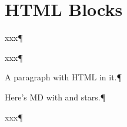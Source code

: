 

\section{HTML Blocks
}
xxx¶\par
xxx¶\par
A paragraph with  HTML in it.¶\par
Here’s MD with  and  stars.¶\par
xxx¶\par
